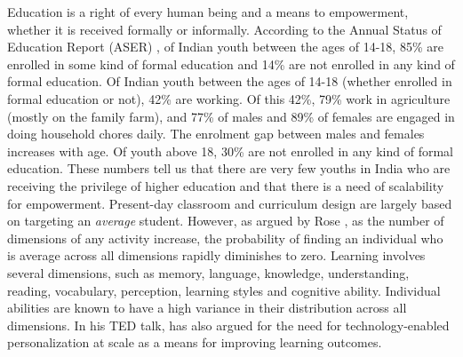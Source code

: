 \begin{multicols}{2}
Education is a right of every human being and a means to empowerment, whether it is received formally or informally. According to the Annual Status of Education Report (ASER) \cite{art2-key01}, of Indian youth between the ages of 14-18, 85\% are enrolled in some kind of formal education and 14\% are not enrolled in any kind of formal education. Of Indian youth between the ages of 14-18 (whether enrolled in formal education or not), 42\% are working. Of this 42\%, 79\% work in agriculture (mostly on the family farm), and 77\% of males and 89\% of females are engaged in doing household chores daily. The enrolment gap between males and females increases with age. Of youth above 18, 30\% are not enrolled in any kind of formal education. These numbers tell us that there are very few youths in India who are receiving the privilege of higher education and that there is a need of scalability for empowerment. Present-day classroom and curriculum design are largely based on targeting an \textit{average} student. However, as argued by Rose \cite{art2-key43}, as the number of dimensions of any activity increase, the probability of finding an individual who is average across all dimensions rapidly diminishes to zero. Learning involves several dimensions, such as memory, language, knowledge, understanding, reading, vocabulary, perception, learning styles \cite{art2-key15} and cognitive ability. Individual abilities are known to have a high variance in their distribution across all dimensions. In his TED talk, \cite{art2-key42} has also argued for the need for technology-enabled personalization at scale as a means for improving learning outcomes. 


\end{multicols}
